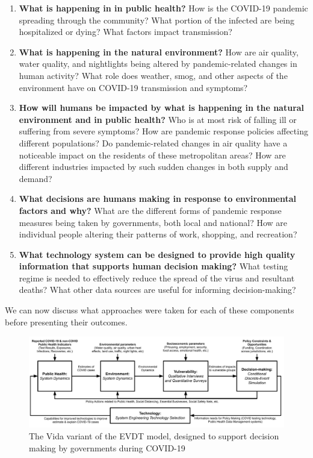 \begin{enumerate}[itemsep=0pt,parsep=0pt]
	\item \textbf{What is happening in in public health?} How is the COVID-19 pandemic spreading through the community? What portion of the infected are being hospitalized or dying? What factors impact transmission?
	\item \textbf{What is happening in the natural environment?} How are air quality, water quality, and nightlights being altered by pandemic-related changes in human activity? What role does weather, smog, and other aspects of the environment have on COVID-19 transmission and symptoms?
	\item \textbf{How will humans be impacted by what is happening in the natural environment and in public health?} Who is at most risk of falling ill or suffering from severe symptoms? How are pandemic response policies affecting different populations? Do pandemic-related changes in air quality have a noticeable impact on the residents of these metropolitan areas? How are different industries impacted by such sudden changes in both supply and demand?
	\item \textbf{What decisions are humans making in response to environmental factors and why?} What are the different forms of pandemic response measures being taken by governments, both local and national? How are individual people altering their patterns of work, shopping, and recreation?  
	\item \textbf{What technology system can be designed to provide high quality information that supports human decision making?} What testing regime is needed to effectively reduce the spread of the virus and resultant deaths? What other data sources are useful for informing decision-making?
\end{enumerate}

We can now discuss what approaches were taken for each of these components before presenting their outcomes.

\begin{figure}[H]
	\centering
	\includegraphics[scale=0.25]{Figures/chap5/Vida_Flowchart_v2.jpg}
	\caption[The Vida Variant of the EVDT Model]{The Vida variant of the EVDT model, designed to support decision making by governments during COVID-19}
	\label{fig:vida_flow}
\end{figure}

